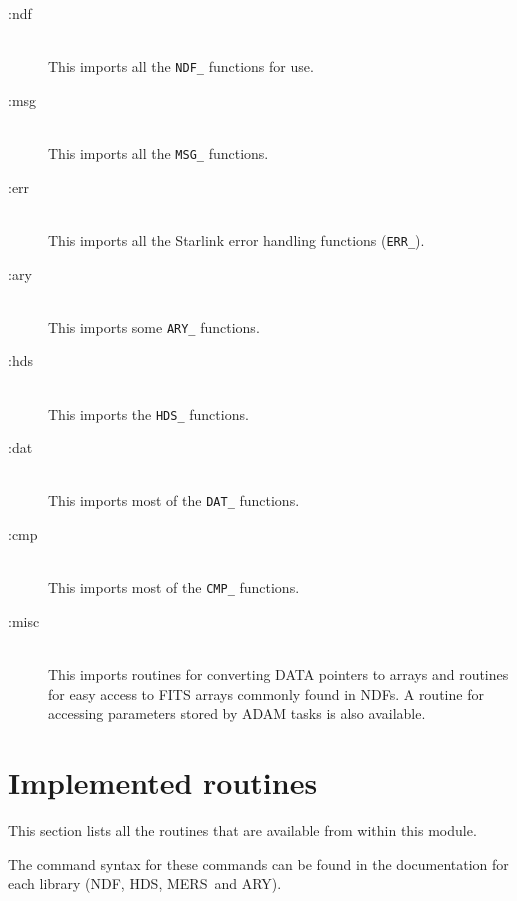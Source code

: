 \documentclass[twoside,11pt]{article}
\newcommand{\xref}[3]{#1}
\newcommand{\xlabel}[1]{}
\newcommand{\ndf}{\xref{NDF}{sun33}{}}
\newcommand{\hds}{\xref{HDS}{sun92}{}}
\newcommand{\ary}{\xref{ARY}{sun11}{}}
\newcommand{\mers}{\xref{MERS}{sun104}{}}
\begin{document}
\begin{description}

\item[:ndf]%
%
\hfil\\
This imports all the \texttt{NDF\_} functions for use.

\item[:msg]%
%
\hfil\\
This imports all the \texttt{MSG\_} functions.

\item[:err]%
%
\hfil\\
This imports all the Starlink error handling functions (\texttt{ERR\_}).

\item[:ary]%
%
\hfil\\
This imports some \texttt{ARY\_} functions.

\item[:hds]%
%
\hfil\\
This imports the \texttt{HDS\_} functions.

\item[:dat]%
%
\hfil\\
This imports most of the \texttt{DAT\_} functions.

\item[:cmp]%
%
\hfil\\
This imports most of the \texttt{CMP\_} functions.

\item[:misc]%
%
\hfil\\
This imports routines for converting DATA pointers to arrays and routines for 
easy access to FITS arrays commonly found in NDFs. A routine for accessing
parameters stored by ADAM tasks is also available.

\end{description}

\section{\xlabel{implemented_routines}Implemented routines}%
\label{implemented_routines}

This section lists all the routines that are available from within this module.

The command syntax for these commands can be found in the documentation
for each library (\ndf, \hds, \mers\ and \ary).
\end{document}

